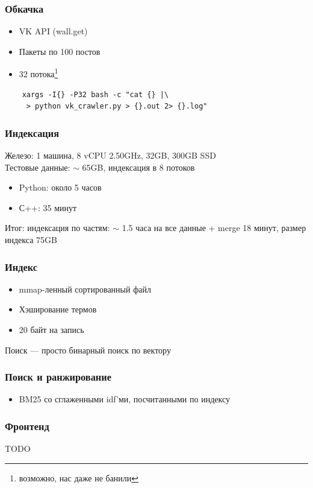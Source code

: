 \documentclass{beamer}
\begin{document}
\begin{frame}[fragile]
  \frametitle{Обкачка}
    \begin{itemize}
      \item VK API (wall.get)
      \item Пакеты по 100 постов
      \item 32 потока\footnote{возможно, нас даже не банили}
    \end{itemize}

  \begin{verbatim}
    xargs -I{} -P32 bash -c "cat {} |\
     > python vk_crawler.py > {}.out 2> {}.log"
  \end{verbatim}

\end{frame}

\begin{frame}
  \frametitle{Индексация}
    Железо: 1 машина, 8 vCPU 2.50GHz, 32GB, 300GB SSD \\
    Тестовые данные: $\sim$ 65GB, индексация в 8 потоков
    \begin{itemize}
      \item Python: около 5 часов
      \item С++: 35 минут
    \end{itemize}
    Итог: индексация по частям: $\sim$ 1.5 часа на все данные + merge 18 минут,
      размер индекса 75GB
\end{frame}

\begin{frame}
  \frametitle{Индекс}
    \begin{itemize}
      \item mmap-ленный сортированный файл
      \item Хэширование термов
      \item 20 байт на запись
    \end{itemize}

    Поиск --- просто бинарный поиск по вектору
\end{frame}

\begin{frame}
  \frametitle{Поиск и ранжирование}
  \begin{itemize}
    \item BM25 со сглаженными idf'ми, посчитанными по индексу
  \end{itemize}
\end{frame}

\begin{frame}
  \frametitle{Фронтенд}
    TODO
\end{frame}
\end{document}
